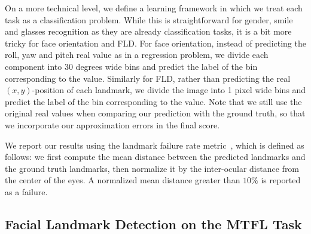 \documentclass[runningheads]{llncs}
\newcommand{\citep}{\cite}
\begin{document}
On a more technical level, we define a learning framework in which we treat each task as a classification problem. While this is straightforward for gender, smile and glasses recognition as they are already classification tasks, it is a bit more tricky for face orientation and FLD. For face orientation, instead of predicting the roll, yaw and pitch real value as in a regression problem, we divide each component into 30 degrees wide bins and predict the label of the bin corresponding to the value. Similarly for FLD, rather than predicting the real $(x,y)$-position of each landmark, we divide the image into 1 pixel wide bins and predict the label of the bin corresponding to the value. Note that we still use the original real values when comparing our prediction with the ground truth, so that we incorporate our approximation errors in the final score.

We report our results using the landmark failure rate metric~\citep{zhang2014facial}, which is defined as follows: we first compute the mean distance between the predicted landmarks and the ground truth landmarks, then normalize it by the inter-ocular distance from the center of the eyes. A normalized mean distance greater than $10\%$ is reported as a failure.



\subsection{Facial Landmark Detection on the MTFL Task}
\label{ssec:mtfl-results}
\end{document}
